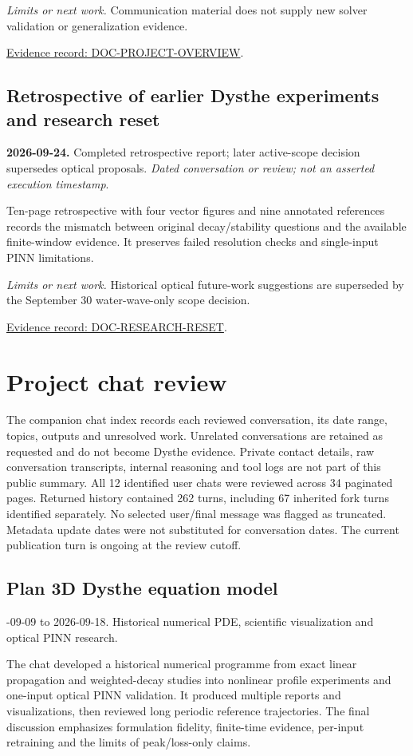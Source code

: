 \documentclass[11pt]{article}
\begin{document}
\noindent\textit{Limits or next work.} Communication material does not supply new solver validation or generalization evidence.

\noindent\href{https://github.com/matasvai/dysthe-paper/blob/codex/research-record-2026-11-05/research-record/2026-11-05/README.md#doc-project-overview}{Evidence record: DOC-PROJECT-OVERVIEW}.
\subsection*{Retrospective of earlier Dysthe experiments and research reset}
\noindent\textbf{2026-09-24.} Completed retrospective report; later active-scope decision supersedes optical proposals. \emph{Dated conversation or review; not an asserted execution timestamp}.\par
Ten-page retrospective with four vector figures and nine annotated references records the mismatch between original decay/stability questions and the available finite-window evidence. It preserves failed resolution checks and single-input PINN limitations.

\noindent\textit{Limits or next work.} Historical optical future-work suggestions are superseded by the September 30 water-wave-only scope decision.

\noindent\href{https://github.com/matasvai/dysthe-paper/blob/codex/research-record-2026-11-05/research-record/2026-11-05/README.md#doc-research-reset}{Evidence record: DOC-RESEARCH-RESET}.

\section{Project chat review}
The companion chat index records each reviewed conversation, its date range, topics, outputs and unresolved work. Unrelated conversations are retained as requested and do not become Dysthe evidence. Private contact details, raw conversation transcripts, internal reasoning and tool logs are not part of this public summary.
\noindent All 12 identified user chats were reviewed across 34 paginated pages. Returned history contained 262 turns, including 67 inherited fork turns identified separately. No selected user/final message was flagged as truncated. Metadata update dates were not substituted for conversation dates. The current publication turn is ongoing at the review cutoff.\par
{}
\subsection*{Plan 3D Dysthe equation model}
-09-09 to 2026-09-18. Historical numerical PDE, scientific visualization and optical PINN research.\par
The chat developed a historical numerical programme from exact linear propagation and weighted-decay studies into nonlinear profile experiments and one-input optical PINN validation. It produced multiple reports and visualizations, then reviewed long periodic reference trajectories. The final discussion emphasizes formulation fidelity, finite-time evidence, per-input retraining and the limits of peak/loss-only claims.
\end{document}
